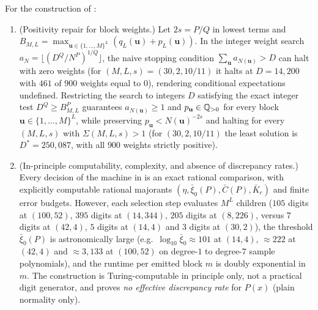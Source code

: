 \documentclass[11pt]{article}
\begin{document}
\begin{maintheorem}\label{thm:C}
For the construction of :
\begin{enumerate}[label=\textup{(\roman*)},nosep]
\item {} \textup{(Positivity repair for block weights.)} Let $2s=P/Q$ in lowest terms and $B_{M,L}=\max_{\mathbf{u}\in\{1,\dots,M\}^L}(q_L(\mathbf{u})+p_L(\mathbf{u}))$. In the integer weight search $a_N=\lfloor(D^Q/N^P)^{1/Q}\rfloor$, the naive stopping condition $\sum_{\mathbf{u}}a_{N(\mathbf{u})}>D$ can halt with zero weights (for $(M,L,s)=(30,2,10/11)$ it halts at $D=14{,}200$ with $461$ of $900$ weights equal to $0$), rendering conditional expectations undefined. Restricting the search to integers $D$ satisfying the exact integer test $D^Q\ge B_{M,L}^P$ guarantees $a_{N(\mathbf{u})}\ge1$ and $p_{\mathbf{u}}\in\mathbb Q_{>0}$ for every block $\mathbf{u}\in\{1,\dots,M\}^L$, while preserving $p_{\mathbf{u}}<N(\mathbf{u})^{-2s}$ and halting for every $(M,L,s)$ with $\Sigma(M,L,s)>1$ (for $(30,2,10/11)$ the least solution is $D^*=250{,}087$, with all $900$ weights strictly positive).
\item {} \textup{(In-principle computability, complexity, and absence of discrepancy rates.)} Every decision of the machine in  is an exact rational comparison, with explicitly computable rational majorants $(\eta,\bar\xi_0(P),\bar C(P),\bar K_e)$ and finite error budgets. However, each selection step evaluates $M^L$ children ($105$ digits at $(100,52)$, $395$ digits at $(14,344)$, $205$ digits at $(8,226)$, versus $7$ digits at $(42,4)$, $5$ digits at $(14,4)$ and $3$ digits at $(30,2)$), the threshold $\bar\xi_0(P)$ is astronomically large (e.g.\ $\log_{10}\bar\xi_0\approx101$ at $(14,4)$, $\approx222$ at $(42,4)$ and $\approx3{,}133$ at $(100,52)$ on degree-$1$ to degree-$7$ sample polynomials), and the runtime per emitted block $m$ is doubly exponential in $m$. The construction is Turing-computable in principle only, not a practical digit generator, and proves \emph{no effective discrepancy rate} for $P(x)$ (plain normality only).

\end{enumerate}
\end{maintheorem}
\end{document}
